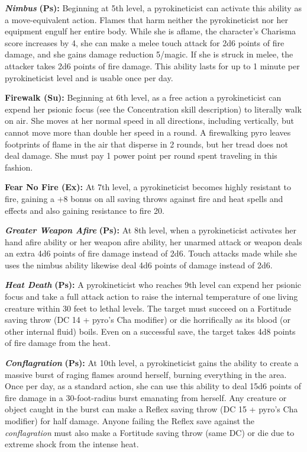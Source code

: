 \documentclass{article}
\begin{document}
\textit{\textbf{Nimbus }}\textbf{(Ps):} Beginning at 5th level, a pyrokineticist 
can activate this ability as a move-equivalent action. Flames that harm neither 
the pyrokineticist nor her equipment engulf her entire body. While she is aflame, 
the character's Charisma score increases by 4, she can make a melee touch attack 
for 2d6 points of fire damage, and she gains damage reduction 5/magic. If she is 
struck in melee, the attacker takes 2d6 points of fire damage. This ability lasts 
for up to 1 minute per pyrokineticist level and is usable once per day.

\textbf{Firewalk (Su):} Beginning at 6th level, as a free action a pyrokineticist 
can expend her psionic focus (see the Concentration skill description) to literally 
walk on air. She moves at her normal speed in all directions, including vertically, 
but cannot move more than double her speed in a round. A firewalking pyro leaves 
footprints of flame in the air that disperse in 2 rounds, but her tread does not 
deal damage. She must pay 1 power point per round spent traveling in this fashion.

\textbf{Fear No Fire (Ex):} At 7th level, a pyrokineticist becomes highly resistant 
to fire, gaining a +8 bonus on all saving throws against fire and heat spells and 
effects and also gaining resistance to fire 20.

\textit{\textbf{Greater Weapon Afire }}\textbf{(Ps):} At 8th level, when a pyrokineticist 
activates her hand afire ability or her weapon afire ability, her unarmed attack 
or weapon deals an extra 4d6 points of fire damage instead of 2d6. Touch attacks 
made while she uses the nimbus ability likewise deal 4d6 points of damage instead 
of 2d6.

\textit{\textbf{Heat Death }}\textbf{(Ps):} A pyrokineticist who reaches 9th level 
can expend her psionic focus and take a full attack action to raise the internal 
temperature of one living creature within 30 feet to lethal levels. The target 
must succeed on a Fortitude saving throw (DC 14 + pyro's Cha modifier) or die horrifically 
as its blood (or other internal fluid) boils. Even on a successful save, the target 
takes 4d8 points of fire damage from the heat.

\textit{\textbf{Conflagration }}\textbf{(Ps):} At 10th level, a pyrokineticist 
gains the ability to create a massive burst of raging flames around herself, burning 
everything in the area. Once per day, as a standard action, she can use this ability 
to deal 15d6 points of fire damage in a 30-foot-radius burst emanating from herself. 
Any creature or object caught in the burst can make a Reflex saving throw (DC 15 
+ pyro's Cha modifier) for half damage. Anyone failing the Reflex save against 
the \textit{conflagration }must also make a Fortitude saving throw (same DC) or 
die due to extreme shock from the intense heat.
\end{document}
